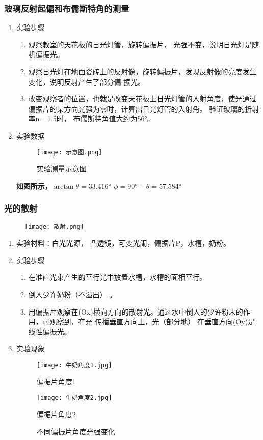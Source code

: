 \documentclass[dvipsnames, svgnames,a4paper,11pt]{article}
\begin{document}
	\subsubsection{玻璃反射起偏和布儒斯特角的测量}
	\begin{enumerate}
		\item 实验步骤
	\begin{enumerate}
		\item 观察教室的天花板的日光灯管，旋转偏振片， 光强不变，说明日光灯是随机偏振光。
		\item 观察日光灯在地面瓷砖上的反射像，旋转偏振片，发现反射像的亮度发生变化，说明反射产生了部分偏
		振光。
		\item 改变观察者的位置，也就是改变天花板上日光灯管的入射角度，使光通过偏振片的某方向光强为零时，计算出日光灯管的入射角。 验证玻璃的折射率n= 1.5时， 布儒斯特角值大约为56°。
	\end{enumerate}
\item 实验数据
   \begin{figure}[{H}]
	\centering
	\texttt{[image: 示意图.png]}
	\caption{实验测量示意图}
	\label{}
   \end{figure}
   \textbf{如图所示，$\arctan\theta=33.416°$ \quad $\phi=90°-\theta=57.584°$}
\end{enumerate}
	\subsubsection{光的散射}
	\begin{figure}[{H}]
		\centering
		\texttt{[image: 散射.png]}
	
		\label{}
	\end{figure}
	\begin{enumerate}
		\item 实验材料：白光光源， 凸透镜，可变光阑，偏振片P，水槽，奶粉。
		\item 实验步骤
		\begin{enumerate}
			\item 在准直光束产生的平行光中放置水槽，水槽的面相平行。
			\item 倒入少许奶粉（不溢出） 。
			\item 用偏振片观察在(Ox)横向方向的散射光。通过水中倒入的少许粉末的作用，可观察到，在光
			传播垂直方向上，光（部分地） 在垂直方向(Oy)是线性偏振光。
		\end{enumerate}
		\item 实验现象
		\begin{figure}[H]
			\centering
			\begin{minipage}[b]{0.45\textwidth}
				\centering
				\texttt{[image: 牛奶角度1.jpg]}
				\caption{偏振片角度1}
				\label{fig:minipage1}
			\end{minipage}
			\hfill
			\begin{minipage}[b]{0.45\textwidth}
				\centering
				\texttt{[image: 牛奶角度2.jpg]}
				\caption{偏振片角度2}
				\label{fig:minipage2}
			\end{minipage}
			\caption{不同偏振片角度光强变化}
			\label{fig:combined_minipage}
		\end{figure}
		
	\end{enumerate}
	 
\end{document}
